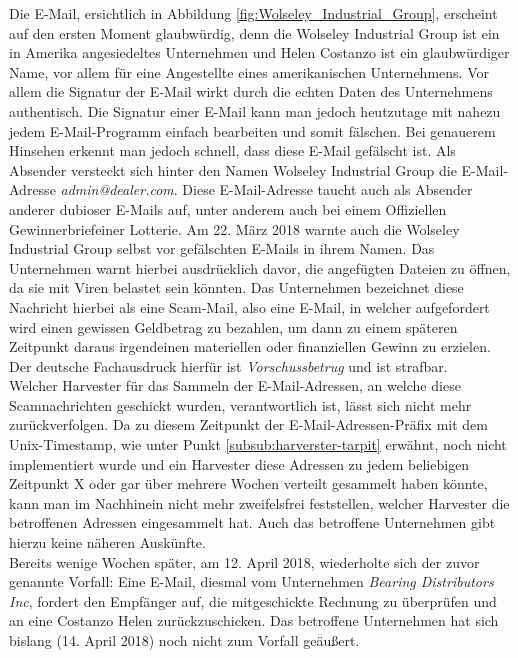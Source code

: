 Die E-Mail, ersichtlich in Abbildung \ref{fig:Wolseley_Industrial_Group}, erscheint auf den ersten Moment glaubwürdig, denn die Wolseley Industrial Group ist ein in Amerika angesiedeltes Unternehmen und Helen Costanzo ist ein glaubwürdiger Name, vor allem für eine Angestellte eines amerikanischen Unternehmens. Vor allem die Signatur der E-Mail wirkt durch die echten Daten des Unternehmens authentisch. Die Signatur einer E-Mail kann man jedoch heutzutage mit nahezu jedem E-Mail-Programm einfach bearbeiten und somit fälschen. Bei genauerem Hinsehen erkennt man jedoch schnell, dass diese E-Mail gefälscht ist. Als Absender versteckt sich hinter den Namen Wolseley Industrial Group die E-Mail-Adresse \emph{admin@dealer.com}. Diese E-Mail-Adresse taucht auch als Absender anderer dubioser E-Mails auf, unter anderem auch bei einem \glqq Offiziellen Gewinnerbrief\grqq\space einer Lotterie.\cite{gewinnerbrief-admin-dealer} Am 22. März 2018 warnte auch die Wolseley Industrial Group selbst vor gefälschten E-Mails in ihrem Namen.\cite{scam-warnung-wolseley} Das Unternehmen warnt hierbei ausdrücklich davor, die angefügten Dateien zu öffnen, da sie mit Viren belastet sein könnten. Das Unternehmen bezeichnet diese Nachricht hierbei als eine Scam-Mail, also eine E-Mail, in welcher aufgefordert wird einen gewissen Geldbetrag zu bezahlen, um dann zu einem späteren Zeitpunkt daraus irgendeinen materiellen oder finanziellen Gewinn zu erzielen. Der deutsche Fachausdruck hierfür ist \emph{Vorschussbetrug} und ist strafbar.\cite{vorschussbetrug}\\
Welcher Harvester für das Sammeln der E-Mail-Adressen, an welche diese Scamnachrichten geschickt wurden, verantwortlich ist, lässt sich nicht mehr zurückverfolgen. Da zu diesem Zeitpunkt der E-Mail-Adressen-Präfix mit dem Unix-Timestamp, wie unter Punkt \ref{subsub:harverster-tarpit} erwähnt, noch nicht implementiert wurde und ein Harvester diese Adressen zu jedem beliebigen Zeitpunkt X oder gar über mehrere Wochen verteilt gesammelt haben könnte, kann man im Nachhinein nicht mehr zweifelsfrei feststellen, welcher Harvester die betroffenen Adressen eingesammelt hat. Auch das betroffene Unternehmen gibt hierzu keine näheren Auskünfte.
\\Bereits wenige Wochen später, am 12. April 2018, wiederholte sich der zuvor genannte Vorfall: Eine E-Mail, diesmal vom Unternehmen \emph{Bearing Distributors Inc}, fordert den Empfänger auf, die mitgeschickte Rechnung zu überprüfen und an eine Costanzo Helen zurückzuschicken. Das betroffene Unternehmen hat sich bislang (14. April 2018) noch nicht zum Vorfall geäußert.
